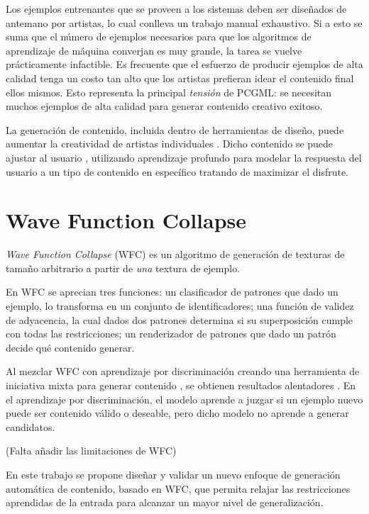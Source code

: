Los ejemplos entrenantes que se proveen
a los sistemas deben ser diseñados de antemano por artistas, lo cual
conlleva un trabajo manual exhaustivo. Si a esto se suma que el número
de ejemplos necesarios para que los algoritmos de aprendizaje de máquina
converjan es muy grande, la tarea se vuelve prácticamente infactible.
Es frecuente que el esfuerzo de producir ejemplos de alta calidad
tenga un costo tan alto que los artistas prefieran idear
el contenido final ellos mismos. Esto representa la principal
\textit{tensión} de PCGML: se necesitan muchos ejemplos de alta calidad
para generar contenido creativo exitoso.

La generación de contenido, incluida dentro de herramientas de diseño,
puede aumentar la creatividad de artistas individuales \cite{bib:4}.
Dicho contenido se puede ajustar al usuario
\cite{bib:7}, utilizando aprendizaje profundo para modelar la respuesta
del usuario a un tipo de contenido en específico tratando de maximizar
el disfrute.

\section*{Wave Function Collapse}

\textit{Wave Function Collapse} (WFC) \cite{bib:16}
es un algoritmo de generación de texturas de tamaño arbitrario
a partir de \textit{una} textura de ejemplo.

En WFC se aprecian tres funciones: un clasificador de patrones 
que dado un ejemplo, lo transforma en un conjunto de identificadores;
una función de validez de adyacencia, la cual dados dos patrones determina
si su superposición cumple con todas las restricciones; un 
renderizador de patrones que dado un patrón decide qué contenido generar.

Al mezclar WFC con aprendizaje por discriminación \cite{bib:12}
creando una herramienta de iniciativa mixta 
para generar contenido \cite{bib:4},
se obtienen resultados
alentadores \cite{bib:3}. En el aprendizaje por 
discriminación, el modelo aprende a juzgar si un ejemplo nuevo
puede ser contenido válido o deseable, pero dicho modelo no aprende
a generar candidatos.

(Falta añadir las limitaciones de WFC)

En este trabajo se propone diseñar y validar un nuevo enfoque de generación
automática de contenido, basado en WFC, que permita relajar las restricciones 
aprendidas de la entrada para alcanzar un mayor nivel de generalización.

